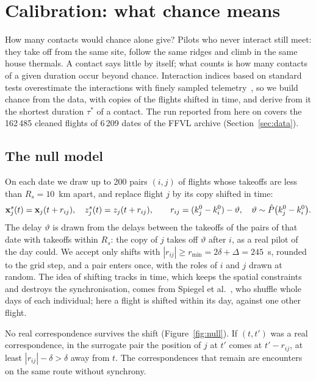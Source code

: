 \section{Calibration: what chance means}\label{sec:calibration}

How many contacts would chance alone give? Pilots who never interact still meet: they take off
from the same site, follow the same ridges and climb in the same house thermals. A contact says
little by itself; what counts is how many contacts of a given duration occur beyond chance.
Interaction indices based on standard tests overestimate the interactions with finely
sampled telemetry~\cite{long2014}, so we build chance from the data, with copies of the flights shifted in
time, and derive from it the shortest duration $\tau^*$ of a contact. The run reported from here
on covers the 162\,485 cleaned flights of 6\,209 dates of the FFVL archive
(Section~\ref{sec:data}).

\subsection{The null model}\label{sec:null}

On each date we draw up to 200 pairs $(i,j)$ of flights whose takeoffs are less than $R_s=10$~km
apart, and replace flight $j$ by its copy shifted in time:
\begin{equation}\label{eq:shift}
  \mathbf{x}^s_j(t)=\mathbf{x}_j(t+r_{ij}),\quad z^s_j(t)=z_j(t+r_{ij}),\qquad
  r_{ij}=(k^0_j-k^0_i)-\vartheta,\quad \vartheta\sim\hat P\bigl(k^0_j-k^0_i\bigr).
\end{equation}
The delay $\vartheta$ is drawn from the delays between the takeoffs of the pairs of that date with
takeoffs within $R_s$: the copy of $j$ takes off $\vartheta$ after $i$, as a real pilot of the
day could. We accept only shifts with $|r_{ij}|\ge r_{\min}=2\delta+\Delta=245$~s, rounded to the
grid step, and a pair enters once, with the roles of $i$ and $j$ drawn at random. The idea of
shifting tracks in time, which keeps the spatial constraints and destroys the synchronisation,
comes from Spiegel et al.~\cite{spiegel2016}, who shuffle whole days of each individual; here a
flight is shifted within its day, against one other flight.

No real correspondence survives the shift (Figure~\ref{fig:null}). If $(t,t')$ was a real
correspondence, in the surrogate pair the position of $j$ at $t'$ comes at $t'-r_{ij}$, at least
$|r_{ij}|-\delta>\delta$ away from $t$. The correspondences that remain are encounters on the same
route without synchrony.

